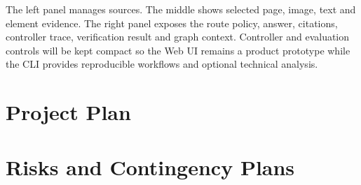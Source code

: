 \documentclass{article}
\begin{document}
The left panel manages sources. The middle shows selected page, image, text and element evidence. The right panel exposes the route policy, answer, citations, controller trace, verification result and graph context. Controller and evaluation controls will be kept compact so the Web UI remains a product prototype while the CLI provides reproducible workflows and optional technical analysis.

\section{Project Plan}

\begin{center}
\scriptsize
{}
\end{center}

\section{Risks and Contingency Plans}
\end{document}
